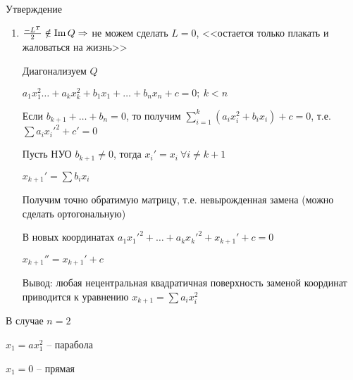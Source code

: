 \documentclass[12pt]{article}
\begin{document}
\begin{theo}{Утверждение}
\begin{enumerate}
        \item $\frac{-L^T}{2} \notin \operatorname{Im} Q \Rightarrow$ не можем сделать $L = 0$, <<остается только плакать и жаловаться на жизнь>>
        
        Диагонализуем $Q$

        $a_1x_1^2 \ldots + a_kx_k^2 + b_1x_1 + \ldots + b_nx_n + c = 0;\ k < n$

        Если $b_{k + 1} + \ldots + b_n = 0$, то получим $\sum\limits_{i = 1}^k (a_ix_i^2 + b_ix_i) + c = 0$, т.е. $\sum a_ix_i'^2 + c' = 0$

        Пусть НУО $b_{k + 1} \neq 0$, тогда $x_i' = x_i\ \forall i \neq k + 1$

        $x_{k + 1}' = \sum b_ix_i$

        Получим точно обратимую матрицу, т.е. невырожденная замена (можно сделать ортогональную)

        В новых координатах $a_1x_1'^2 + \ldots + a_kx_k'^2 + x_{k + 1}' + c = 0$

        $x_{k + 1}'' = x_{k + 1}' + c$

        Вывод: любая нецентральная квадратичная поверхность заменой координат приводится к уравнению $x_{k + 1} = \sum a_ix_i^2$
    \end{enumerate}
\end{theo}

\begin{Example}{}
    В случае $n = 2$

    $x_1 = ax_1^2$ -- парабола

    $x_1 = 0$ -- прямая 
\end{Example}
\end{document}
